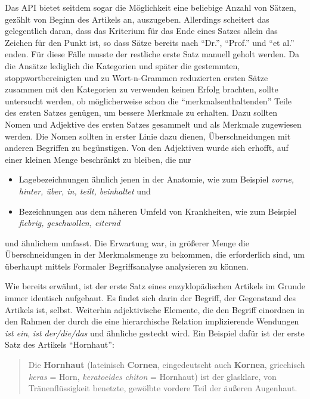 \documentclass[pagesize,paper=A4,DIV=calc,fontsize=12pt,draft=false]{scrreprt}
\begin{document}
Das API bietet seitdem sogar die Möglichkeit eine beliebige Anzahl von Sätzen, gezählt von Beginn des Artikels an, auszugeben. 
Allerdings scheitert das gelegentlich daran, dass das Kriterium für das Ende eines Satzes allein das Zeichen für den Punkt ist, so dass Sätze bereits nach \enquote{Dr.}, \enquote{Prof.} und \enquote{et al.} enden. 
Für diese Fälle musste der restliche erste Satz manuell geholt werden. 
Da die Ansätze lediglich die Kategorien und später die gestemmten, stoppwortbereinigten und zu Wort-n-Grammen reduzierten ersten Sätze zusammen mit den Kategorien zu verwenden keinen Erfolg brachten, sollte untersucht werden, ob möglicherweise schon die \enquote{merkmalsenthaltenden} Teile des ersten Satzes genügen, um bessere Merkmale zu erhalten. 
Dazu sollten Nomen und Adjektive des ersten Satzes gesammelt und als Merkmale zugewiesen werden. 
Die Nomen sollten in erster Linie dazu dienen, Überschneidungen mit anderen Begriffen zu begünstigen. 
Von den Adjektiven wurde sich erhofft, auf einer kleinen Menge beschränkt zu bleiben, die nur 

\begin{itemize}
\item Lagebezeichnungen ähnlich jenen in der Anatomie, wie zum Beispiel \textit{vorne, hinter, über, in, teilt, beinhaltet} und
\item Bezeichnungen aus dem näheren Umfeld von Krankheiten, wie zum Beispiel \textit{fiebrig, geschwollen, eiternd}
\end{itemize}

und ähnlichem umfasst. 
Die Erwartung war, in größerer Menge die Überschneidungen in der Merkmalsmenge zu bekommen, die erforderlich sind, um überhaupt mittels Formaler Begriffsanalyse analysieren zu können. 

Wie bereits erwähnt, ist der erste Satz eines enzyklopädischen Artikels im Grunde immer identisch aufgebaut. 
Es findet sich darin der Begriff, der Gegenstand des Artikels ist, selbst. 
Weiterhin adjektivische Elemente, die den Begriff einordnen in den Rahmen der durch die eine hierarchische Relation implizierende Wendungen \textit{ist ein}, \textit{ist der/die/das} und ähnliche gesteckt wird. 
Ein Beispiel dafür ist der erste Satz des Artikels \enquote{Hornhaut}: 

\begin{quote}
Die \textbf{Hornhaut} (lateinisch \textbf{Cornea}, eingedeutscht auch \textbf{Kornea}, griechisch \emph{keras} = Horn, \emph{keratoeides chiton} = Hornhaut) ist der glasklare, von Tränenflüssigkeit benetzte, gewölbte vordere Teil der äußeren Augenhaut. 
\end{quote}
\end{document}
